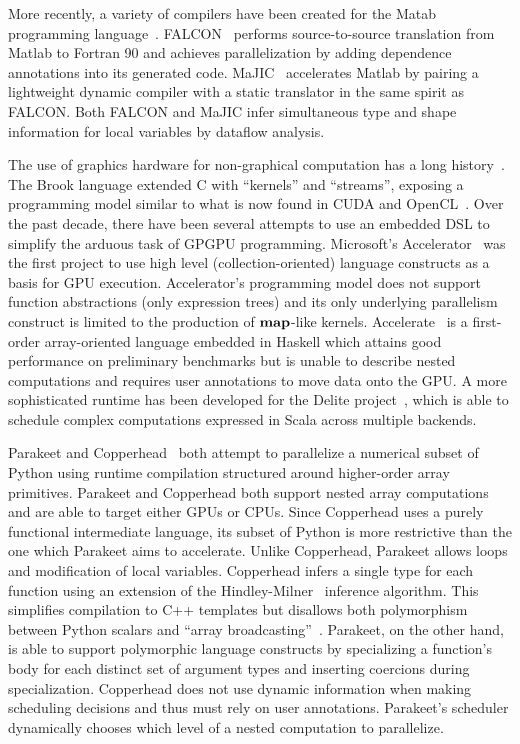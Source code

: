 \documentclass[10pt,twocolumn]{article}
\begin{document}
More recently, a variety of compilers have been created for the Matab programming language~\cite{Moler80}. FALCON~\cite{DeRose95} performs source-to-source translation from Matlab to Fortran 90 and achieves parallelization by adding dependence annotations into its generated code. MaJIC~\cite{Alma02} accelerates Matlab by pairing a lightweight dynamic compiler with a static translator in the same spirit as FALCON. Both FALCON and MaJIC infer simultaneous type and shape information for local variables by dataflow analysis.

The use of graphics hardware for non-graphical computation has a long history~\cite{Leng90}. The Brook language extended C with ``kernels'' and ``streams'', exposing a programming model similar to what is now found in CUDA and OpenCL~\cite{Buck04}.  Over the past decade, there have been several attempts to use an embedded DSL to simplify the arduous task of GPGPU programming. Microsoft's Accelerator~\cite{Tard06} was the first project to use high level (collection-oriented) language constructs as a basis for GPU execution. Accelerator's programming model does not support function abstractions (only expression trees) and its only underlying parallelism construct is limited to the production of $\mbox{\textbf{map}}$-like kernels.  Accelerate~\cite{Chak11} is a first-order array-oriented language embedded in Haskell which attains good performance on preliminary benchmarks but is unable to describe nested computations and requires user annotations to move data onto the GPU. A more sophisticated runtime has been developed for 
the Delite project~\cite{Brown11}, which is able to schedule complex computations expressed in Scala across multiple backends. 

Parakeet and Copperhead~\cite{Cata11} both attempt to parallelize a numerical subset of Python using runtime compilation structured around higher-order array primitives. Parakeet and Copperhead both support nested array computations and are able to target either GPUs or CPUs. Since Copperhead uses a purely functional intermediate language, its subset of Python is more restrictive than the one which Parakeet aims to accelerate. Unlike Copperhead, Parakeet allows loops and  modification of local variables. Copperhead infers a single type for each function using an extension of the Hindley-Milner~\cite{Damas82} inference algorithm. This simplifies compilation to C++ templates but disallows both polymorphism between Python scalars and ``array broadcasting''~\cite{Oliphant07}. Parakeet, on the other hand, is able to support polymorphic language constructs by specializing a function's body for each distinct set of argument types and inserting coercions during specialization. Copperhead does not use dynamic information when making scheduling decisions and thus must rely on user annotations. Parakeet's scheduler dynamically chooses which level of a nested computation to parallelize. 
\end{document}
